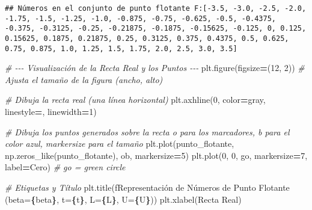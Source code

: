 \documentclass[
]{article}
\newenvironment{Shaded}{\begin{snugshade}}{\end{snugshade}}
\newcommand{\CommentTok}[1]{\textcolor[rgb]{0.56,0.35,0.01}{\textit{#1}}}
\newcommand{\DecValTok}[1]{\textcolor[rgb]{0.00,0.00,0.81}{#1}}
\newcommand{\NormalTok}[1]{#1}
\newcommand{\OperatorTok}[1]{\textcolor[rgb]{0.81,0.36,0.00}{\textbf{#1}}}
\newcommand{\SpecialCharTok}[1]{\textcolor[rgb]{0.81,0.36,0.00}{\textbf{#1}}}
\newcommand{\SpecialStringTok}[1]{\textcolor[rgb]{0.31,0.60,0.02}{#1}}
\newcommand{\StringTok}[1]{\textcolor[rgb]{0.31,0.60,0.02}{#1}}
\begin{document}
\begin{verbatim}
## Números en el conjunto de punto flotante F:[-3.5, -3.0, -2.5, -2.0, -1.75, -1.5, -1.25, -1.0, -0.875, -0.75, -0.625, -0.5, -0.4375, -0.375, -0.3125, -0.25, -0.21875, -0.1875, -0.15625, -0.125, 0, 0.125, 0.15625, 0.1875, 0.21875, 0.25, 0.3125, 0.375, 0.4375, 0.5, 0.625, 0.75, 0.875, 1.0, 1.25, 1.5, 1.75, 2.0, 2.5, 3.0, 3.5]
\end{verbatim}

\begin{Shaded}
\begin{Highlighting}[]
\CommentTok{\# {-}{-}{-} Visualización de la Recta Real y los Puntos {-}{-}{-}}
\NormalTok{plt.figure(figsize}\OperatorTok{=}\NormalTok{(}\DecValTok{12}\NormalTok{, }\DecValTok{2}\NormalTok{)) }\CommentTok{\# Ajusta el tamaño de la figura (ancho, alto)}

\CommentTok{\# Dibuja la recta real (una línea horizontal)}
\NormalTok{plt.axhline(}\DecValTok{0}\NormalTok{, color}\OperatorTok{=}\StringTok{\textquotesingle{}gray\textquotesingle{}}\NormalTok{, linestyle}\OperatorTok{=}\StringTok{\textquotesingle{}{-}\textquotesingle{}}\NormalTok{, linewidth}\OperatorTok{=}\DecValTok{1}\NormalTok{) }

\CommentTok{\# Dibuja los puntos generados sobre la recta \textquotesingle{}o\textquotesingle{} para los marcadores, \textquotesingle{}b\textquotesingle{} para el color azul, markersize para el tamaño}
\NormalTok{plt.plot(punto\_flotante, np.zeros\_like(punto\_flotante), }\StringTok{\textquotesingle{}ob\textquotesingle{}}\NormalTok{, markersize}\OperatorTok{=}\DecValTok{5}\NormalTok{)}
\NormalTok{plt.plot(}\DecValTok{0}\NormalTok{, }\DecValTok{0}\NormalTok{, }\StringTok{\textquotesingle{}go\textquotesingle{}}\NormalTok{, markersize}\OperatorTok{=}\DecValTok{7}\NormalTok{, label}\OperatorTok{=}\StringTok{\textquotesingle{}Cero\textquotesingle{}}\NormalTok{) }\CommentTok{\# \textquotesingle{}go\textquotesingle{} = green circle}

\CommentTok{\# Etiquetas y Título}
\NormalTok{plt.title(}\SpecialStringTok{f\textquotesingle{}Representación de Números de Punto Flotante (beta=}\SpecialCharTok{\{}\NormalTok{beta}\SpecialCharTok{\}}\SpecialStringTok{, t=}\SpecialCharTok{\{}\NormalTok{t}\SpecialCharTok{\}}\SpecialStringTok{, L=}\SpecialCharTok{\{}\NormalTok{L}\SpecialCharTok{\}}\SpecialStringTok{, U=}\SpecialCharTok{\{}\NormalTok{U}\SpecialCharTok{\}}\SpecialStringTok{)\textquotesingle{}}\NormalTok{)}
\NormalTok{plt.xlabel(}\StringTok{\textquotesingle{}Recta Real\textquotesingle{}}\NormalTok{)}


\end{Highlighting}
\end{Shaded}
\end{document}
